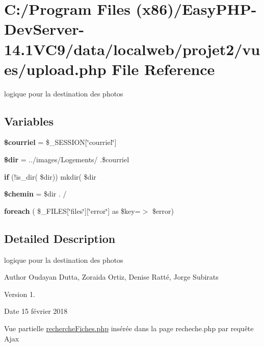 \hypertarget{upload_8php}{}\section{C\+:/\+Program Files (x86)/\+Easy\+P\+H\+P-\/\+Dev\+Server-\/14.1\+V\+C9/data/localweb/projet2/vues/upload.php File Reference}
\label{upload_8php}


logique pour la destination des photos  


\subsection*{Variables}
\begin{DoxyCompactItemize}
\item 
\mbox{\label{upload_8php_a8ff270e937d198a5176cf0f0263474c6}} 
{\bfseries \$courriel} = \$\+\_\+\+S\+E\+S\+S\+I\+ON\mbox{[}\char`\"{}courriel\char`\"{}\mbox{]}
\item 
\mbox{\label{upload_8php_a1659f0a629d408e0f849dbe4ee061e62}} 
{\bfseries \$dir} = \textquotesingle{}../images/Logements/\textquotesingle{} .\$courriel
\item 
{\bfseries if} (!is\+\_\+dir( \$dir)) mkdir( \$dir
\item 
\mbox{\label{upload_8php_a367abc06e55c440c638a820e7f40aa00}} 
{\bfseries \$chemin} = \$dir . \textquotesingle{}/\textquotesingle{}
\item 
\mbox{\label{upload_8php_a563a9b1813038cca992836f2da8a4ee6}} 
{\bfseries foreach} ( \$\+\_\+\+F\+I\+L\+ES\mbox{[}\char`\"{}files\char`\"{}\mbox{]}\mbox{[}\char`\"{}error\char`\"{}\mbox{]} as \$key=$>$ \$error)
\end{DoxyCompactItemize}


\subsection{Detailed Description}
logique pour la destination des photos 

\begin{DoxyAuthor}{Author}
Oudayan Dutta, Zoraida Ortiz, Denise Ratté, Jorge Subirats 
\end{DoxyAuthor}
\begin{DoxyVersion}{Version}
1. 
\end{DoxyVersion}
\begin{DoxyDate}{Date}
15 février 2018
\end{DoxyDate}
Vue partielle \hyperlink{recherche_fiches_8php}{recherche\+Fiches.\+php} insérée dans la page recheche.\+php par requête Ajax 

